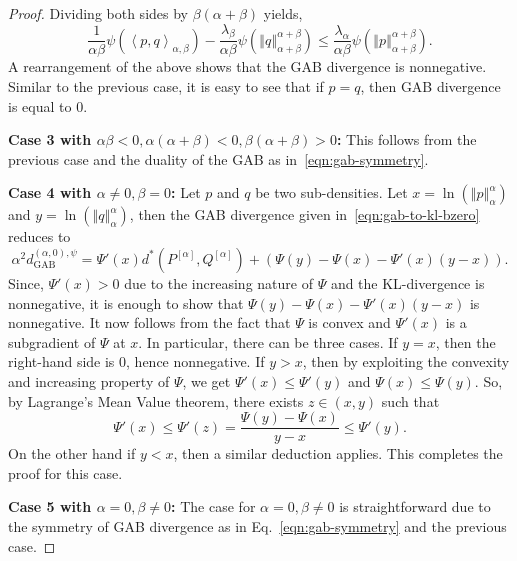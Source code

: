 \documentclass[10pt,a4paper]{amsart}
\newcommand{\dGAB}{d_{\mathrm{GAB}}}
\newcommand{\inner}[1]{\left\langle #1\right\rangle}
\newcommand{\norm}[1]{\left\Vert #1 \right\Vert}
\begin{document}
\begin{proof}
    \noindent Dividing both sides by $\beta(\alpha+\beta)$ yields,
    \begin{equation*}
        \dfrac{1}{\alpha\beta} \psi\left( \inner{p,q}_{\alpha,\beta} \right) - \dfrac{\lambda_\beta}{\alpha\beta}\psi\left( \norm{q}_{\alpha+\beta}^{\alpha+\beta} \right) \leq \dfrac{\lambda_\alpha}{\alpha\beta} \psi\left( \norm{p}_{\alpha+\beta}^{\alpha+\beta} \right).
    \end{equation*}
    \noindent A rearrangement of the above shows that the GAB divergence is nonnegative. Similar to the previous case, it is easy to see that if $p = q$, then GAB divergence is equal to $0$.

    \noindent\textbf{Case 3 with $\alpha\beta < 0, \alpha(\alpha+\beta) < 0, \beta(\alpha+\beta) > 0$:} This follows from the previous case and the duality of the GAB as in~\eqref{eqn:gab-symmetry}.

    \noindent\textbf{Case 4 with $\alpha \neq 0, \beta = 0$:} Let $p$ and $q$ be two sub-densities. Let $x = \ln(\norm{p}_{\alpha}^{\alpha})$ and $y = \ln(\norm{q}_{\alpha}^{\alpha})$, then the GAB divergence given in~\eqref{eqn:gab-to-kl-bzero} reduces to
    \begin{equation*}
        \alpha^2 \dGAB^{(\alpha,0),\psi}
        = \Psi'(x) d^\ast(P^{[\alpha]}, Q^{[\alpha]}) + \left( \Psi(y) - \Psi(x) - \Psi'(x)(y-x) \right).
    \end{equation*}
    \noindent Since, $\Psi'(x) > 0$ due to the increasing nature of $\Psi$ and the KL-divergence is nonnegative, it is enough to show that $\Psi(y)-\Psi(x)-\Psi'(x)(y-x)$ is nonnegative. It now follows from the fact that $\Psi$ is convex and $\Psi'(x)$ is a subgradient of $\Psi$ at $x$. In particular, there can be three cases. If $y = x$, then the right-hand side is $0$, hence nonnegative. If $y > x$, then by exploiting the convexity and increasing property of $\Psi$, we get $\Psi'(x)\le \Psi'(y)$ and $\Psi(x)\le \Psi(y)$. So, by Lagrange's Mean Value theorem, there exists $z\in (x,y)$ such that
    \begin{equation*}
        \Psi'(x) \leq \Psi'(z) = \frac{\Psi(y)-\Psi(x)}{y-x}\le \Psi'(y).
    \end{equation*}
    \noindent On the other hand if $y < x$, then a similar deduction applies. This completes the proof for this case.

    \noindent\textbf{Case 5 with $\alpha = 0, \beta \neq 0$:} The case for $\alpha = 0, \beta \neq 0$ is straightforward due to the symmetry of GAB divergence as in Eq.~\eqref{eqn:gab-symmetry} and the previous case.
\end{proof}
\end{document}
